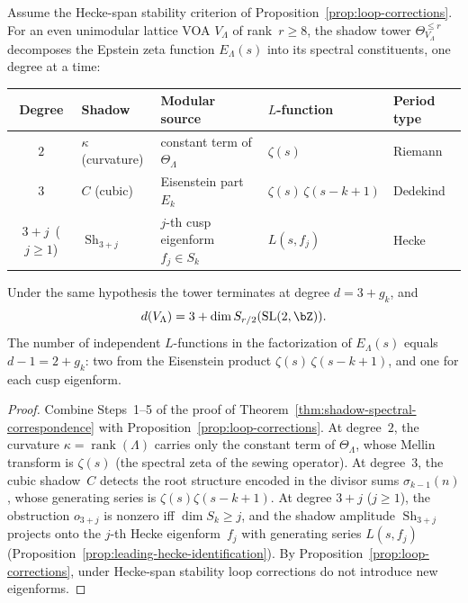 \begin{proposition}
\label{prop:period-shadow-dictionary}
\ClaimStatusProvedHere
Assume the Hecke-span stability criterion of
Proposition~\textup{\ref{prop:loop-corrections}}. For an even
unimodular lattice VOA $V_\Lambda$ of rank~$r\ge8$,
the shadow tower $\Theta_{V_\Lambda}^{\le r}$ decomposes
the Epstein zeta function $E_\Lambda(s)$ into its spectral
constituents, one degree at a time:
\begin{center}
\renewcommand{\arraystretch}{1.35}
\begin{tabular}{cllll}
\toprule
\textbf{Degree}
 & \textbf{Shadow}
 & \textbf{Modular source}
 & \textbf{$L$-function}
 & \textbf{Period type} \\
\midrule
$2$
 & $\kappa$ \textup{(curvature)}
 & constant term of $\Theta_\Lambda$
 & $\zeta(s)$
 & Riemann \\
$3$
 & $C$ \textup{(cubic)}
 & Eisenstein part $E_k$
 & $\zeta(s)\,\zeta(s{-}k{+}1)$
 & Dedekind \\
$3+j$\, ($j\ge1$)
 & $\operatorname{Sh}_{3+j}$
 & $j$-th cusp eigenform $f_j \in S_k$
 & $L(s, f_j)$
 & Hecke \\
\bottomrule
\end{tabular}
\end{center}
Under the same hypothesis the tower terminates at degree $d = 3 + g_k$,
and
\begin{equation}\label{eq:depth-cusp-full}
 d(V_\Lambda)
 = 3 + \dim S_{r/2}(\mathrm{SL}(2,\bZ)).
\end{equation}
The number of independent $L$-functions in the factorization of
$E_\Lambda(s)$ equals $d-1 = 2 + g_k$: two from the Eisenstein
product $\zeta(s)\,\zeta(s{-}k{+}1)$, and one for each cusp
eigenform.
\end{proposition}

\begin{proof}
Combine Steps~1--5 of the proof of
Theorem~\ref{thm:shadow-spectral-correspondence}
with Proposition~\ref{prop:loop-corrections}.
At degree~$2$, the curvature $\kappa = \operatorname{rank}(\Lambda)$
carries only the constant term of $\Theta_\Lambda$, whose Mellin
transform is $\zeta(s)$ (the spectral zeta of the sewing operator).
At degree~$3$, the cubic shadow~$C$ detects the root structure
encoded in the divisor sums $\sigma_{k-1}(n)$, whose generating
series is $\zeta(s)\zeta(s{-}k{+}1)$. At degree $3+j$
($j\ge1$), the obstruction $o_{3+j}$ is nonzero iff
$\dim S_k \ge j$, and the shadow amplitude
$\operatorname{Sh}_{3+j}$ projects onto the $j$-th Hecke
eigenform~$f_j$ with generating series $L(s,f_j)$
(Proposition~\ref{prop:leading-hecke-identification}).
By Proposition~\ref{prop:loop-corrections}, under Hecke-span
stability loop corrections do not introduce new eigenforms.
\end{proof}


